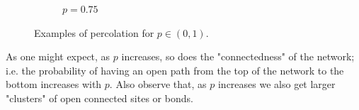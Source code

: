 \begin{figure}[h!]
\begin{subfigure}[b]{0.3\textwidth}
    \caption{$p=0.75$}
    \label{fig:p=0.75}
  \end{subfigure}
  \caption{Examples of percolation for $p\in(0,1)$.}
  \label{fig:probabilities}
\end{figure}

As one might expect, as $p$ increases, so does the "connectedness" of the network; i.e. the probability of having an open path from the top of the network to the bottom increases
with $p$. Also observe that, as $p$ increases we also get larger "clusters" of open connected sites or bonds.
